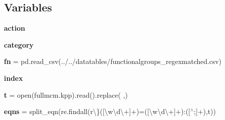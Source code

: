 \subsection*{Variables}
\begin{DoxyCompactItemize}
\item 
\mbox{\label{namespacedsmacc_1_1graph_1_1permutate_a1c0d87d093abd0ef6954c89601e51601}} 
{\bfseries action}
\item 
\mbox{\label{namespacedsmacc_1_1graph_1_1permutate_aa777576ff6037ac7c9b21c8763732cb1}} 
{\bfseries category}
\item 
\mbox{\label{namespacedsmacc_1_1graph_1_1permutate_a4fe8aafd930ed4201f11fa8fe43c5e5a}} 
{\bfseries fn} = pd.\+read\+\_\+csv(\textquotesingle{}../../datatables/functionalgroups\+\_\+regexmatched.\+csv\textquotesingle{})
\item 
\mbox{\label{namespacedsmacc_1_1graph_1_1permutate_ac6ca38399a9e761c796b6f6b4872b6d1}} 
{\bfseries index}
\item 
\mbox{\label{namespacedsmacc_1_1graph_1_1permutate_aabf66a1c4488375c241b94f72695e5d2}} 
{\bfseries t} = open(\textquotesingle{}fullmcm.\+kpp\textquotesingle{}).read().replace(\textquotesingle{} \textquotesingle{},\textquotesingle{}\textquotesingle{})
\item 
\mbox{\label{namespacedsmacc_1_1graph_1_1permutate_a419dfa46f9f342b37b8d534a521391a2}} 
{\bfseries eqns} = split\+\_\+eqn(re.\+findall(r\textquotesingle{}\textbackslash{}\}(\mbox{[}\textbackslash{}w\textbackslash{}d\textbackslash{}+\mbox{]}+)=(\mbox{[}\textbackslash{}w\textbackslash{}d\textbackslash{}+\mbox{]}+)\+:(\mbox{[}$^\wedge$;\mbox{]}+)\textquotesingle{},t))
\item 
\mbox{\label{namespacedsmacc_1_1graph_1_1permutate_acde2db55a676a2581f171d660221c730}} 

\end{DoxyCompactItemize}
